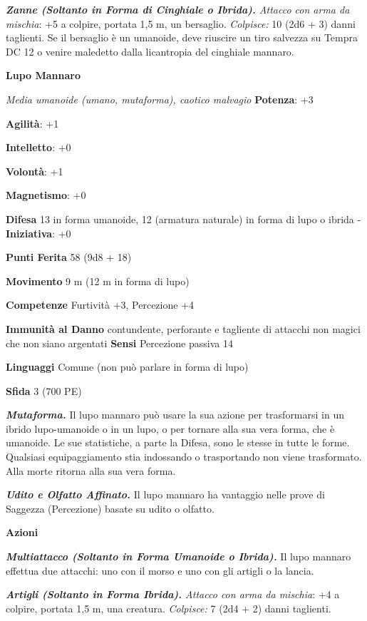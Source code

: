 \begin{multicols}{2}
\emph{\textbf{Zanne (Soltanto in Forma di Cinghiale o Ibrida).} Attacco
con arma da mischia}: +5 a colpire, portata 1,5 m, un bersaglio.
\emph{Colpisce:} 10 (2d6 + 3) danni taglienti. Se il bersaglio è un
umanoide, deve riuscire un tiro salvezza su Tempra DC 12 o venire
maledetto dalla licantropia del cinghiale mannaro.

\textbf{Lupo Mannaro}

\emph{Media umanoide (umano, mutaforma), caotico malvagio}
\textbf{Potenza}: +3

\textbf{Agilità}: +1

\textbf{Intelletto}: +0

\textbf{Volontà}: +1

\textbf{Magnetismo}: +0

\textbf{Difesa} 13 in forma umanoide, 12 (armatura naturale) in
forma di lupo o ibrida - \textbf{Iniziativa}: +0

\textbf{Punti Ferita} 58 (9d8 + 18)

\textbf{Movimento} 9 m (12 m in forma di lupo)

\textbf{Competenze} Furtività +3, Percezione +4

\textbf{Immunità al Danno} contundente, perforante e tagliente di
attacchi non magici che non siano argentati \textbf{Sensi} Percezione
passiva 14

\textbf{Linguaggi} Comune (non può parlare in forma di lupo)

\textbf{Sfida} 3 (700 PE)

\emph{\textbf{Mutaforma.}} Il lupo mannaro può usare la sua azione per
trasformarsi in un ibrido lupo-umanoide o in un lupo, o per tornare alla
sua vera forma, che è umanoide. Le sue statistiche, a parte la Difesa, sono
le stesse in tutte le forme. Qualsiasi equipaggiamento stia indossando o
trasportando non viene trasformato. Alla morte ritorna alla sua vera
forma.

\emph{\textbf{Udito e Olfatto Affinato.}} Il lupo mannaro ha vantaggio
nelle prove di Saggezza (Percezione) basate su udito o olfatto.

\textbf{Azioni}

\emph{\textbf{Multiattacco (Soltanto in Forma Umanoide o Ibrida).}} Il
lupo mannaro effettua due attacchi: uno con il morso e uno con gli
artigli o la lancia.

\emph{\textbf{Artigli (Soltanto in Forma Ibrida).} Attacco con arma da
mischia}: +4 a colpire, portata 1,5 m, una creatura. \emph{Colpisce:} 7
(2d4 + 2) danni taglienti.


\end{multicols}
